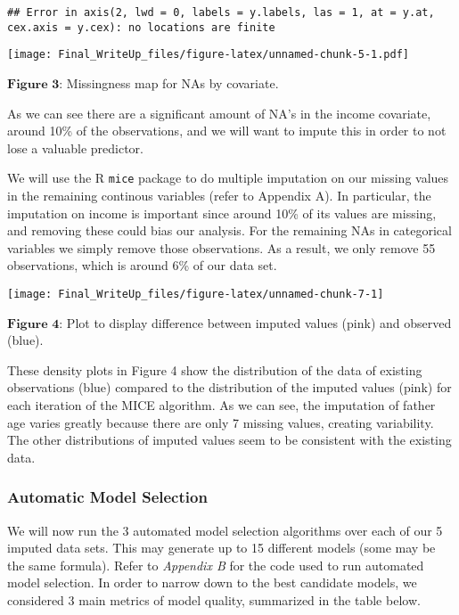 \documentclass[]{article}
\begin{document}
\(\;\)

\begin{verbatim}
## Error in axis(2, lwd = 0, labels = y.labels, las = 1, at = y.at, cex.axis = y.cex): no locations are finite
\end{verbatim}

\texttt{[image: Final\_WriteUp\_files/figure-latex/unnamed-chunk-5-1.pdf]}

\(\textbf{Figure 3}\): Missingness map for NAs by covariate.

As we can see there are a significant amount of NA's in the income
covariate, around 10\% of the observations, and we will want to impute
this in order to not lose a valuable predictor.

We will use the R \texttt{mice} package to do multiple imputation on our
missing values in the remaining continous variables (refer to Appendix
A). In particular, the imputation on income is important since around
10\% of its values are missing, and removing these could bias our
analysis. For the remaining NAs in categorical variables we simply
remove those observations. As a result, we only remove 55 observations,
which is around 6\% of our data set.

\begin{center}\texttt{[image: Final\_WriteUp\_files/figure-latex/unnamed-chunk-7-1]} \end{center}

\(\textbf{Figure 4}\): Plot to display difference between imputed values
(pink) and observed (blue).

These density plots in Figure 4 show the distribution of the data of
existing observations (blue) compared to the distribution of the imputed
values (pink) for each iteration of the MICE algorithm. As we can see,
the imputation of father age varies greatly because there are only 7
missing values, creating variability. The other distributions of imputed
values seem to be consistent with the existing data.

\subsubsection{Automatic Model
Selection}\label{automatic-model-selection}

We will now run the 3 automated model selection algorithms over each of
our 5 imputed data sets. This may generate up to 15 different models
(some may be the same formula). Refer to \emph{Appendix B} for the code
used to run automated model selection. In order to narrow down to the
best candidate models, we considered 3 main metrics of model quality,
summarized in the table below.
\end{document}
